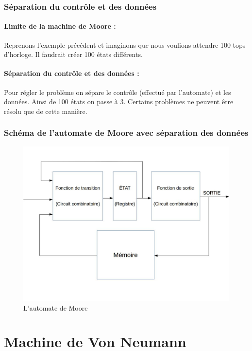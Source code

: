 \documentclass[10pt,a4paper,twoside]{article}
\begin{document}
\subsubsection{Séparation du contrôle et des données}
\paragraph{Limite de la machine de Moore :} Reprenons l'exemple précédent et imaginons que nous voulions attendre 100 tops d'horloge. Il faudrait créer 100 états différents.

\paragraph{Séparation du contrôle et des données :} Pour régler le problème on sépare le contrôle (effectué par l'automate) et les données. Ainsi de 100 états on passe à 3. Certains problèmes ne peuvent être résolu que de cette manière.

\subsubsection{Schéma de l'automate de Moore avec séparation des données}

\begin{figure}[hbtp]
\caption{L'automate de Moore}
\centering
\includegraphics[scale=0.33]{SchemaMachineMoore.jpg} 
\end{figure}
\FloatBarrier

\newpage
\section{Machine de Von Neumann}
\end{document}

